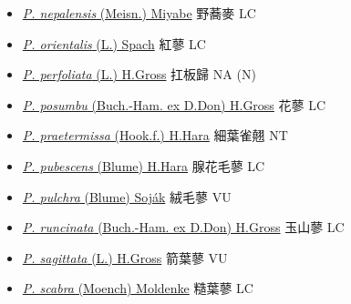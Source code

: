 \begin{itemize}
\begin{itemize}
        \item[] \href{http://www.theplantlist.org/tpl1.1/search?q=Persicaria+nepalensis}{\textit{P. nepalensis} (Meisn.) Miyabe}   野蕎麥   LC
        \item[] \href{http://www.theplantlist.org/tpl1.1/search?q=Persicaria+orientalis}{\textit{P. orientalis} (L.) Spach}   紅蓼   LC
        \item[] \href{http://www.theplantlist.org/tpl1.1/search?q=Persicaria+perfoliata}{\textit{P. perfoliata} (L.) H.Gross}   扛板歸   NA (N)
        \item[] \href{http://www.theplantlist.org/tpl1.1/search?q=Persicaria+posumbu}{\textit{P. posumbu} (Buch.-Ham. ex D.Don) H.Gross}   花蓼   LC
        \item[] \href{http://www.theplantlist.org/tpl1.1/search?q=Persicaria+praetermissa}{\textit{P. praetermissa} (Hook.f.) H.Hara}   細葉雀翹   NT
        \item[] \href{http://www.theplantlist.org/tpl1.1/search?q=Persicaria+pubescens}{\textit{P. pubescens} (Blume) H.Hara}   腺花毛蓼   LC
        \item[] \href{http://www.theplantlist.org/tpl1.1/search?q=Persicaria+pulchra}{\textit{P. pulchra} (Blume) Soják}   絨毛蓼   VU
        \item[] \href{http://www.theplantlist.org/tpl1.1/search?q=Persicaria+runcinata}{\textit{P. runcinata} (Buch.-Ham. ex D.Don) H.Gross}   玉山蓼   LC
        \item[] \href{http://www.theplantlist.org/tpl1.1/search?q=Persicaria+sagittata}{\textit{P. sagittata} (L.) H.Gross}   箭葉蓼   VU
        \item[] \href{http://www.theplantlist.org/tpl1.1/search?q=Persicaria+scabra}{\textit{P. scabra} (Moench) Moldenke}   糙葉蓼   LC

\end{itemize}
\end{itemize}
